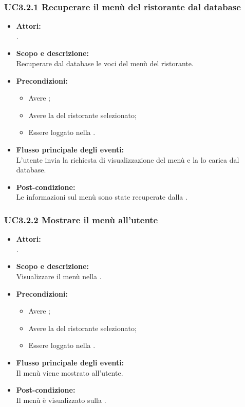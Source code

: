 \subsubsection{UC3.2.1 Recuperare il menù del ristorante dal database} \label{UC3.2.1}

\begin{itemize}
	\item \textbf{Attori:}
	\\.
	\item \textbf{Scopo e descrizione:} 
	\\Recuperare dal database le voci del menù del ristorante.
	\item \textbf{Precondizioni:}
	\begin{itemize}
		\item Avere ;
		\item Avere la  del ristorante selezionato;
		\item Essere loggato nella .
	\end{itemize}
	\item \textbf{Flusso principale degli eventi:}
	\\L'utente invia la richiesta di visualizzazione del menù e la  lo carica dal database.
	\item \textbf{Post-condizione:}
	\\Le informazioni sul menù sono state recuperate dalla .
\end{itemize}

\subsubsection{UC3.2.2 Mostrare il menù all'utente} \label{UC3.2.2}

\begin{itemize}
	\item \textbf{Attori:}
	\\.
	\item \textbf{Scopo e descrizione:} 
	\\Visualizzare il menù nella .
	\item \textbf{Precondizioni:}
	\begin{itemize}
		\item Avere ;
		\item Avere la  del ristorante selezionato;
		\item Essere loggato nella .
	\end{itemize}
	\item \textbf{Flusso principale degli eventi:}
	\\Il menù viene mostrato all'utente.
	\item \textbf{Post-condizione:}
	\\Il menù è visualizzato sulla .
\end{itemize}


